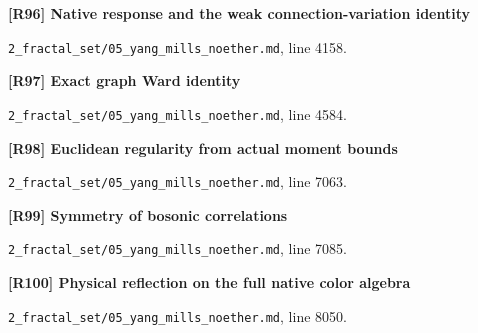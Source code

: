 \documentclass[11pt,a4paper]{article}
\begin{document}
\par\medskip\noindent\begin{minipage}{\linewidth}\textbf{[R96] Native response and the weak connection-variation identity}\label{src:prop-ym-native-connection-variation-identity}\par
{\small\texttt{}\par
\nolinkurl{2_fractal_set/05_yang_mills_noether.md}, line 4158.\par}
\end{minipage}\par

\par\medskip\noindent\begin{minipage}{\linewidth}\textbf{[R97] Exact graph Ward identity}\label{src:lem-ym-discrete-ward}\par
{\small\texttt{}\par
\nolinkurl{2_fractal_set/05_yang_mills_noether.md}, line 4584.\par}
\end{minipage}\par

\par\medskip\noindent\begin{minipage}{\linewidth}\textbf{[R98] Euclidean regularity from actual moment bounds}\label{src:thm-os-os0-fg}\par
{\small\texttt{}\par
\nolinkurl{2_fractal_set/05_yang_mills_noether.md}, line 7063.\par}
\end{minipage}\par

\par\medskip\noindent\begin{minipage}{\linewidth}\textbf{[R99] Symmetry of bosonic correlations}\label{src:thm-os-os4-fg}\par
{\small\texttt{}\par
\nolinkurl{2_fractal_set/05_yang_mills_noether.md}, line 7085.\par}
\end{minipage}\par

\par\medskip\noindent\begin{minipage}{\linewidth}\textbf{[R100] Physical reflection on the full native color algebra}\label{src:prop-ym-native-color-reflected-matrices}\par
{\small\texttt{}\par
\nolinkurl{2_fractal_set/05_yang_mills_noether.md}, line 8050.\par}
\end{minipage}\par
\end{document}
